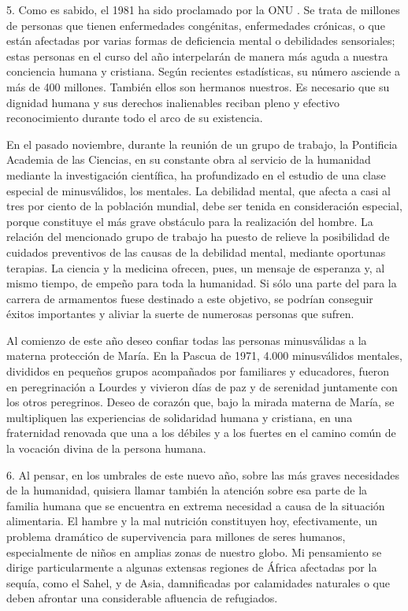 5. Como es sabido, el 1981 ha sido proclamado por la ONU . Se trata de millones de personas que tienen enfermedades congénitas, enfermedades crónicas, o que están afectadas por varias formas de deficiencia mental o debilidades sensoriales; estas personas en el curso del año interpelarán de manera más aguda a nuestra conciencia humana y cristiana. Según recientes estadísticas, su número asciende a más de 400 millones. También ellos son hermanos nuestros. Es necesario que su dignidad humana y sus derechos inalienables reciban pleno y efectivo reconocimiento durante todo el arco de su existencia.

En el pasado noviembre, durante la reunión de un grupo de trabajo, la Pontificia Academia de las Ciencias, en su constante obra al servicio de la humanidad mediante la investigación científica, ha profundizado en el estudio de una clase especial de minusválidos, los mentales. La debilidad mental, que afecta a casi al tres por ciento de la población mundial, debe ser tenida en consideración especial, porque constituye el más grave obstáculo para la realización del hombre. La relación del mencionado grupo de trabajo ha puesto de relieve la posibilidad de cuidados preventivos de las causas de la debilidad mental, mediante oportunas terapias. La ciencia y la medicina ofrecen, pues, un mensaje de esperanza y, al mismo tiempo, de empeño para toda la humanidad. Si sólo una parte del  para la carrera de armamentos fuese destinado a este objetivo, se podrían conseguir éxitos importantes y aliviar la suerte de numerosas personas que sufren.

Al comienzo de este año deseo confiar todas las personas minusválidas a la materna protección de María. En la Pascua de 1971, 4.000 minusválidos mentales, divididos en pequeños grupos acompañados por familiares y educadores, fueron en peregrinación a Lourdes y vivieron días de paz y de serenidad juntamente con los otros peregrinos. Deseo de corazón que, bajo la mirada materna de María, se multipliquen las experiencias de solidaridad humana y cristiana, en una fraternidad renovada que una a los débiles y a los fuertes en el camino común de la vocación divina de la persona humana.

6. Al pensar, en los umbrales de este nuevo año, sobre las más graves necesidades de la humanidad, quisiera llamar también la atención sobre esa parte de la familia humana que se encuentra en extrema necesidad a causa de la situación alimentaria. El hambre y la mal nutrición constituyen hoy, efectivamente, un problema dramático de supervivencia para millones de seres humanos, especialmente de niños en amplias zonas de nuestro globo. Mi pensamiento se dirige particularmente a algunas extensas regiones de África afectadas por la sequía, como el Sahel, y de Asia, damnificadas por calamidades naturales o que deben afrontar una considerable afluencia de refugiados.

